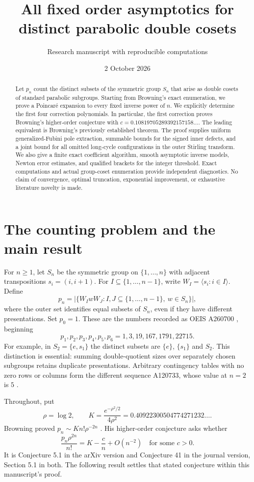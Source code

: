 \documentclass[11pt,letterpaper]{article}
\title{All fixed order asymptotics for distinct parabolic double cosets}
\author{Research manuscript with reproducible computations}
\date{2 October 2026}
\theoremstyle{remark}\newtheorem{remark}[theorem]{Remark}
\begin{document}
\maketitle
\begin{abstract}
Let $p_n$ count the distinct subsets of the symmetric group $S_n$ that arise as double cosets of standard parabolic subgroups. Starting from Browning's exact enumeration, we prove a Poincar\'e expansion to every fixed inverse power of $n$. We explicitly determine the first four correction polynomials. In particular, the first correction proves Browning's higher-order conjecture with $c=0.10819705289392157158\ldots$. The leading equivalent is Browning's previously established theorem. The proof supplies uniform generalized-Fubini pole extraction, summable bounds for the signed inner defects, and a joint bound for all omitted long-cycle configurations in the outer Stirling transform. We also give a finite exact coefficient algorithm, smooth asymptotic inverse models, Newton error estimates, and qualified brackets for the integer threshold. Exact computations and actual group-coset enumeration provide independent diagnostics. No claim of convergence, optimal truncation, exponential improvement, or exhaustive literature novelty is made.
\end{abstract}
\setcounter{tocdepth}{1}
{\small\setlength{\parskip}{0pt}\tableofcontents}
\newpage

\section{The counting problem and the main result}
For $n\geq1$, let $S_n$ be the symmetric group on $\{1,\ldots,n\}$ with adjacent transpositions $s_i=(i,i+1)$. For $I\subseteq\{1,\ldots,n-1\}$, write $W_I=\langle s_i:i\in I\rangle$. Define
\[
 p_n=\left|\{W_IwW_J:I,J\subseteq\{1,\ldots,n-1\},\ w\in S_n\}\right|,
\]
where the outer set identifies equal subsets of $S_n$, even if they have different presentations. Set $p_0=1$. These are the numbers recorded as OEIS A260700 \cite{oeis}, beginning
\[
 p_1,p_2,p_3,p_4,p_5,p_6=1,3,19,167,1791,22715.
\]
For example, in $S_2=\{e,s_1\}$ the distinct subsets are $\{e\}$, $\{s_1\}$ and $S_2$. This distinction is essential: summing double-quotient sizes over separately chosen subgroups retains duplicate presentations. Arbitrary contingency tables with no zero rows or columns form the different sequence A120733, whose value at $n=2$ is $5$ \cite{tables}.

Throughout, put
\begin{equation}\label{pdc:eq:constants}
 \rho=\log 2,\qquad K=\frac{e^{-\rho^2/2}}{4\rho^2}
 =0.40922300504774271232\ldots.
\end{equation}
Browning proved $p_n\sim K n!\rho^{-2n}$ \cite{browning}. His higher-order conjecture asks whether
\begin{equation}\label{pdc:eq:conjecture}
 \frac{p_n\rho^{2n}}{n!}=K-\frac{c}{n}+O(n^{-2})
 \quad\text{for some }c>0.
\end{equation}
It is Conjecture 5.1 in the arXiv version and Conjecture 41 in the journal version, Section 5.1 in both. The following result settles that stated conjecture within this manuscript's proof.
\end{document}
